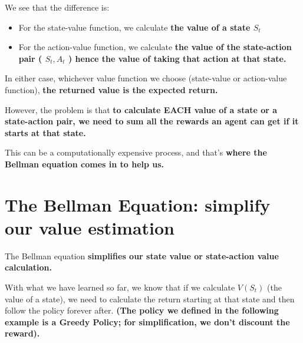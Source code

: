 \documentclass[11pt,a4paper]{article}
\begin{document}

We see that the difference is:

\begin{itemize}
\tightlist
\item
  For the state-value function, we calculate \textbf{the value of a state \(S_t\)}
\item
  For the action-value function, we calculate \textbf{the value of the state-action pair ( \(S_t, A_t\) ) hence the value of taking that action at that state.}
\end{itemize}


In either case, whichever value function we choose (state-value or action-value function), \textbf{the returned value is the expected return.}

However, the problem is that \textbf{to calculate EACH value of a state or a state-action pair, we need to sum all the rewards an agent can get if it starts at that state.}

This can be a computationally expensive process, and that's \textbf{where the Bellman equation comes in to help us.}

\section{The Bellman Equation: simplify our value estimation}\label{the-bellman-equation-simplify-our-value-estimation}

The Bellman equation \textbf{simplifies our state value or state-action value calculation.}


With what we have learned so far, we know that if we calculate \(V(S_t)\) (the value of a state), we need to calculate the return starting at that state and then follow the policy forever after. \textbf{(The policy we defined in the following example is a Greedy Policy; for simplification, we don't discount the reward).}
\end{document}
